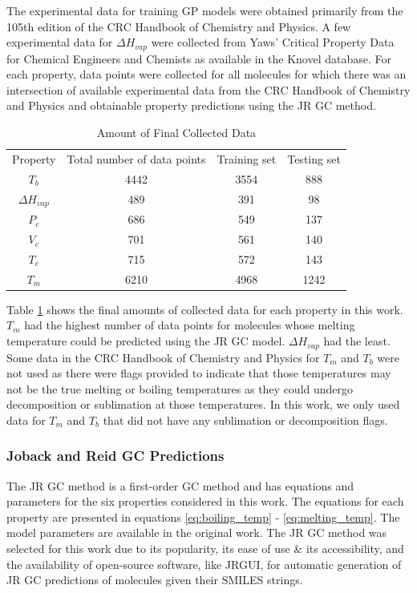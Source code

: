 \documentclass[journal=jacsat,manuscript=article]{achemso}
\begin{document}
The experimental data for training GP models were obtained primarily from the 105th edition of the CRC Handbook of Chemistry and Physics. A few experimental data for $\Delta H_{vap}$ were collected from Yaws' Critical Property Data for Chemical Engineers and Chemists as available in the Knovel database.
For each property, data points were collected for all molecules for which there was an intersection of available experimental data from the CRC Handbook of Chemistry and Physics and obtainable property predictions using the JR GC method.

\begin{table}
    \centering
    \begin{tabular}{cccc}
         Property&  Total number of data points&  Training set& Testing set
         
\\
         $T_b$&  4442&  3554& 888
\\
         $\Delta H_{vap}$&  489&  391& 98
\\
         $P_c$&  686&  549& 137
\\
         $V_c$&  701&  561& 140
\\
         $T_c$&  715&  572& 143
\\
         $T_m$&  6210&  4968& 1242
\\
    \end{tabular}
    \caption{Amount of Final Collected Data}
    \label{tab:collected_data}
\end{table}

Table \ref{tab:collected_data} shows the final amounts of collected data for each property in this work. $T_m$ had the highest number of data points for molecules whose melting temperature could be predicted using the JR GC model. $\Delta H_{vap}$ had the least. Some data in the CRC Handbook of Chemistry and Physics for $T_m$ and $T_b$ were not used as there were flags provided to indicate that those temperatures may not be the true melting or boiling temperatures as they could undergo decomposition or sublimation at those temperatures. In this work, we only used data for $T_m$ and $T_b$ that did not have any sublimation or decomposition flags.

\subsubsection{Joback and Reid GC Predictions}
The JR GC method is a first-order GC method and has equations and parameters for the six properties considered in this work. The equations for each property are presented in equations \ref{eq:boiling_temp} - \ref{eq:melting_temp}. The model parameters are available in the original work.
The JR GC method was selected for this work due to its popularity, its ease of use \& its accessibility, and the availability of open-source software, like JRGUI, for automatic generation of JR GC predictions of molecules given their SMILES strings.
\end{document}
